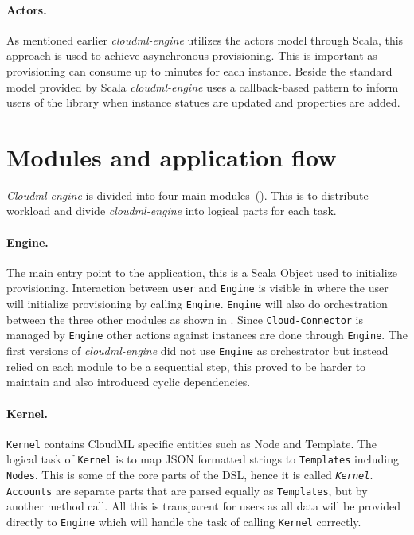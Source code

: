 \paragraph{Actors.}
As mentioned earlier \emph{cloudml-engine} utilizes the actors model through Scala,
this approach is used to achieve asynchronous provisioning.
This is important as provisioning can consume up to minutes for each instance.
Beside the standard model provided by Scala \emph{cloudml-engine} uses
a callback-based pattern to inform users of the library when instance statues
are updated and properties are added.

\section{Modules and application flow}

\emph{Cloudml-engine} is divided into four main modules~().
This is to distribute workload and divide \emph{cloudml-engine} into logical parts for each task.

\paragraph{Engine.} The main entry point to the application, this is a Scala Object used to initialize
provisioning.
Interaction between \texttt{user} and \texttt{Engine} is visible in  
where the user will initialize provisioning by calling \texttt{Engine}.
\texttt{Engine} will also do orchestration between the three other modules
as shown in .
Since \texttt{Cloud-Connector} is managed by \texttt{Engine} other actions against 
instances are done through \texttt{Engine}.
The first versions of \emph{cloudml-engine} did not use \texttt{Engine} as orchestrator but
instead relied on each module to be a sequential step, this proved to be harder to maintain
and also introduced cyclic dependencies.

\paragraph{Kernel.} \texttt{Kernel} contains CloudML specific entities such as Node and Template.
The logical task of \texttt{Kernel} is to map JSON formatted strings to \texttt{Templates} including \texttt{Nodes}.
This is some of the core parts of the DSL, hence it is called \emph{\texttt{Kernel}}.
\texttt{Accounts} are separate parts that are parsed equally as \texttt{Templates},
 but by another method call. All this is transparent for users as all data will
be provided directly to \texttt{Engine} which will handle the task
of calling \texttt{Kernel} correctly.

